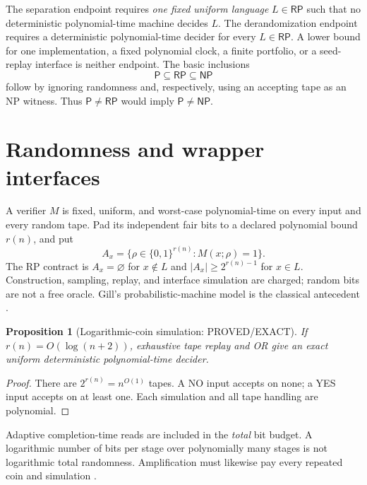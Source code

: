 \documentclass[11pt]{article}
\newtheorem{proposition}[theorem]{Proposition}
\newcommand{\Pclass}{\mathsf P}
\newcommand{\RP}{\mathsf{RP}}
\newcommand{\NP}{\mathsf{NP}}
\begin{document}
The separation endpoint requires \emph{one fixed uniform language}
$L\in\RP$ such that no deterministic polynomial-time machine decides $L$.
The derandomization endpoint requires a deterministic polynomial-time decider
for every $L\in\RP$. A lower bound for one implementation, a fixed polynomial
clock, a finite portfolio, or a seed-replay interface is neither endpoint.
The basic inclusions
\[
\Pclass\subseteq\RP\subseteq\NP
\]
follow by ignoring randomness and, respectively, using an accepting tape as
an NP witness. Thus $\Pclass\ne\RP$ would imply $\Pclass\ne\NP$.

\newpage
\section{Randomness and wrapper interfaces}
A verifier $M$ is fixed, uniform, and worst-case polynomial-time on every
input and every random tape. Pad its independent fair bits to a declared
polynomial bound $r(n)$, and put
\[
 A_x=\{\rho\in\{0,1\}^{r(n)}:M(x;\rho)=1\}.
\]
The RP contract is $A_x=\varnothing$ for $x\notin L$ and
$|A_x|\ge 2^{r(n)-1}$ for $x\in L$. Construction, sampling, replay, and
interface simulation are charged; random bits are not a free oracle.
Gill's probabilistic-machine model is the classical antecedent \cite{gill}.

\begin{proposition}[Logarithmic-coin simulation: PROVED/EXACT]
If $r(n)=O(\log(n+2))$, exhaustive tape replay and OR give an exact uniform
deterministic polynomial-time decider.
\end{proposition}
\begin{proof}
There are $2^{r(n)}=n^{O(1)}$ tapes. A NO input accepts on none; a YES input
accepts on at least one. Each simulation and all tape handling are polynomial.
\end{proof}
Adaptive completion-time reads are included in the \emph{total} bit budget.
A logarithmic number of bits per stage over polynomially many stages is not
logarithmic total randomness. Amplification must likewise pay every repeated
coin and simulation \cite{seed}.
\end{document}
